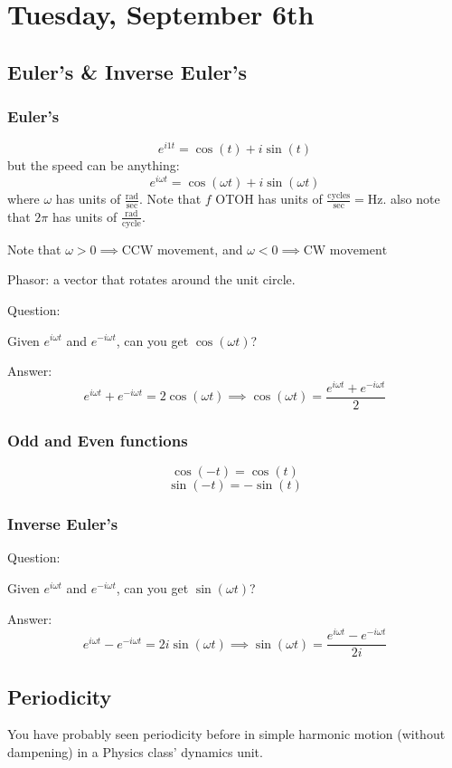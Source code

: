 \section{Tuesday, September 6th}
\subsection{Euler's \& Inverse Euler's}
\subsubsection{Euler's}
\[
    e^{i1t} = \cos(t)+i\sin(t)
\]
but the speed can be anything:
\[
    e^{i\omega t} = \cos(\omega t)+i\sin(\omega t)
\]
where $\omega$ has units of $\frac{\text{rad}}{\text{sec}}$. Note that $f$ OTOH has units of $\frac{\text{cycles}}{\text{sec}}=\text{Hz}$. also note that $2\pi$ has units of $\frac{\text{rad}}{\text{cycle}}$.

Note that $\omega > 0 \implies \text{CCW movement}$, and $\omega < 0 \implies \text{CW movement}$

\begin{shaded}
Phasor: a vector that rotates around the unit circle.
\end{shaded}

Question:
\begin{shaded}
Given $e^{i\omega t}$ and $e^{-i\omega t}$, can you get $\cos(\omega t)$?
\end{shaded}
Answer:
\[
    e^{i\omega t} + e^{-i\omega t} = 2\cos(\omega t)
    \implies
    \boxed{\cos(\omega t)=\frac{e^{i\omega t} + e^{-i\omega t}}{2}}
\]

\subsubsection{Odd and Even functions}
\[
    \cos(-t) = \cos(t)
\]
\[
    \sin(-t) = -\sin(t)
\]

\subsubsection{Inverse Euler's}
Question:
\begin{shaded}
Given $e^{i\omega t}$ and $e^{-i\omega t}$, can you get $\sin(\omega t)$?
\end{shaded}
Answer:
\[
    e^{i\omega t} - e^{-i\omega t} = 2i\sin(\omega t)
    \implies
    \boxed{\sin(\omega t)=\frac{e^{i\omega t} - e^{-i\omega t}}{2i}}
\]

\subsection{Periodicity}
You have probably seen periodicity before in simple harmonic motion (without dampening) in a Physics class' dynamics unit.

